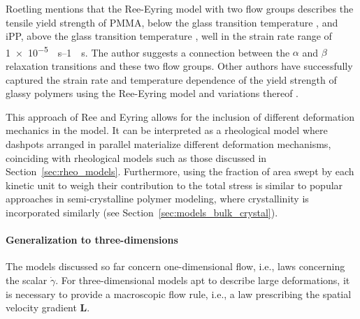 Roetling mentions that the Ree-Eyring model with two flow groups describes the tensile yield strength of PMMA, below the glass transition temperature \citep{roetlingYieldStressBehaviour1965}, and iPP, above the glass transition temperature \citep{roetlingYieldStressBehaviour1966}, well in the strain rate range of \SIrange{1e-5}{1}{\per\second}.
The author suggests a connection between the $\alpha$ and $\beta$ relaxation transitions and these two flow groups.
Other authors have successfully captured the strain rate and temperature dependence of the yield strength of glassy polymers using the Ree-Eyring model and variations thereof \citep{bauwensTensileYieldstressBehavior1969, bauwensRelationCompressionYield1972, bauwens-crowetCompressionYieldBehaviour1973, haussyThermodynamicAnalysisPlastic1980}.

This approach of Ree and Eyring allows for the inclusion of different deformation mechanics in the model.
It can be interpreted as a rheological model where dashpots arranged in parallel materialize different deformation mechanisms, coinciding with rheological models such as those discussed in Section~\ref{sec:rheo_models}.
Furthermore, using the fraction of area swept by each kinetic unit to weigh their contribution to the total stress is similar to popular approaches in semi-crystalline polymer modeling, where crystallinity is incorporated similarly (see Section~\ref{sec:models_bulk_crystal}).

\paragraph{Generalization to three-dimensions}
The models discussed so far concern one-dimensional flow, i.e., laws concerning the scalar $\dot \gamma$.
For three-dimensional models apt to describe large deformations, it is necessary to provide a macroscopic flow rule, i.e., a law prescribing the spatial velocity gradient $\mathbf L$.

